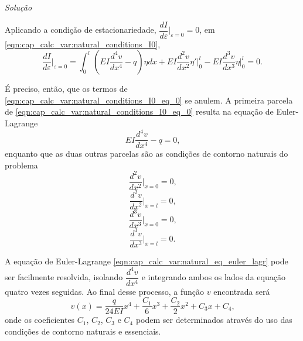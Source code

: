 \documentclass[
	12pt,				%
	openright,			%
    twoside,			%
	a4paper,			%
	english,			%
	french,				%
	spanish,			%
	brazil				%
	]{abntex2}
\makeatletter
\renewenvironment{proof}[1][\proofname]{
	\par\pushQED{\qed}%
	\normalfont \topsep6\p@\@plus6\p@\relax
	\trivlist
	\item\relax
		{\itshape
			#1\@addpunct{.}}\hspace\labelsep\ignorespaces
}{%
	\popQED\endtrivlist\@endpefalse
}
\newenvironment{solution}{
	\begin{proof}[Solução]
}{%
	\end{proof}
}
\numberwithin{lema}{chapter}
\numberwithin{teorema}{chapter}
\numberwithin{definicao}{chapter}
\numberwithin{exemplo}{chapter}
\numberwithin{figure}{chapter}
\makeatother
\begin{document}
\begin{solution}
	Aplicando a condição de estacionariedade, $\dfrac{dI}{d\varepsilon}\Big |_{\varepsilon=0}=0$, em \eqref{eqn:cap_calc_var:natural_conditions_I0},
	\begin{equation}
		\label{eqn:cap_calc_var:natural_conditions_I0_eq_0}
		\frac{dI}{d\varepsilon}\Big |_{\varepsilon=0} = 
			\int_{0}^{l} \left (
				EI\frac{d^4 v}{dx^4}-q 
			\right ) \eta dx
			+
			EI\frac{d^2 v}{dx^2} \eta ' \Big |_{0}^{l}
			-
			EI\frac{d^3 v}{dx^3} \eta \Big |_{0}^{l}
			= 0
			\text{.}
	\end{equation}

	É preciso, então, que os termos de \eqref{eqn:cap_calc_var:natural_conditions_I0_eq_0} se anulem. A primeira parcela de \eqref{eqn:cap_calc_var:natural_conditions_I0_eq_0} resulta na equação de Euler-Lagrange
	\begin{equation}
		\label{eqn:cap_calc_var:natural_eq_euler_lagr}
		EI\frac{d^4v}{dx^4} - q = 0
		\text{,}
	\end{equation}
	enquanto que as duas outras parcelas são as condições de contorno naturais do problema
	\begin{equation}
		\label{eqn:cap_calc_var:natural_cond1}
		\frac{d^2 v}{dx^2}\Big |_{x=0} = 0
		\text{,}
	\end{equation}
	\begin{equation}
		\label{eqn:cap_calc_var:natural_cond1_l}
		\frac{d^2 v}{dx^2}\Big |_{x=l} = 0
		\text{,}
	\end{equation}
	\begin{equation}
		\label{eqn:cap_calc_var:natural_cond2}
		\frac{d^3 v}{dx^3}\Big |_{x=0} = 0
		\text{,}
	\end{equation}
	\begin{equation}
		\label{eqn:cap_calc_var:natural_cond2_l}
		\frac{d^3 v}{dx^3}\Big |_{x=l} = 0
		\text{.}
	\end{equation}

	A equação de Euler-Lagrange \eqref{eqn:cap_calc_var:natural_eq_euler_lagr} pode ser facilmente resolvida, isolando $\dfrac{d^4 v}{dx^4}$ e integrando ambos os lados da equação quatro vezes seguidas. Ao final desse processo, a função $v$ encontrada será
	\begin{equation}
		\label{eqn:cap_calc_var:natural_funcao_v}
		v(x)=\frac{q}{24EI}x^4 + \frac{C_1}{6}x^3 + \frac{C_2}{2}x^2 + C_3x + C_4
		\text{,}
	\end{equation}
	onde os coeficientes $C_1$, $C_2$, $C_3$ e $C_4$ podem ser determinados através do uso das condições de contorno naturais e essenciais.


\end{solution}
\end{document}
